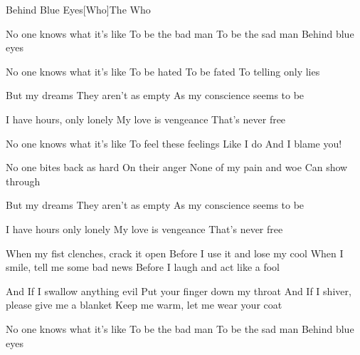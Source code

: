 \documentclass[a4paper,11pt,french]{article}
\begin{document}
\begin{Song}{Behind Blue Eyes}[Who]{The Who}
\begin{multicols}{2}

\begin{Verse}
No one knows what it's like 
To be the bad man 
To be the sad man 
Behind blue eyes 
\espaceInterStrophe

No one knows what it's like 
To be hated 
To be fated 
To telling only lies 
\end{Verse}
\espaceInterStrophe

\begin{Chorus}
But my dreams 
They aren't as empty 
As my conscience seems to be 
\espaceInterStrophe

I have hours, only lonely 
My love is vengeance 
That's never free 
\end{Chorus}
\espaceInterStrophe

\begin{Verse}
No one knows what it's like 
To feel these feelings 
Like I do 
And I blame you! 
\espaceInterStrophe

No one bites back as hard 
On their anger 
None of my pain and woe 
Can show through 
\end{Verse}
\columnbreak

\begin{Chorus}
But my dreams 
They aren't as empty 
As my conscience seems to be 
\espaceInterStrophe

I have hours only lonely 
My love is vengeance 
That's never free 
\end{Chorus}
\espaceInterStrophe

\begin{Bridge}
When my fist clenches, crack it open 
Before I use it and lose my cool 
When I smile, tell me some bad news 
Before I laugh and act like a fool 
\espaceInterStrophe

And If I swallow anything evil 
Put your finger down my throat 
And If I shiver, please give me a blanket 
Keep me warm, let me wear your coat 
\end{Bridge}
\espaceInterStrophe

\begin{Verse}
No one knows what it's like 
To be the bad man 
To be the sad man 
Behind blue eyes
\end{Verse}
\vfill
~
\end{multicols}

\vfill

\begin{multicols}{2}


\end{multicols}
\end{Song}
\end{document}

